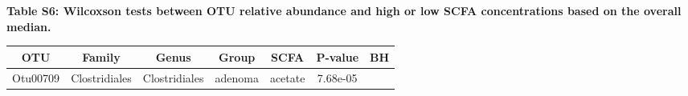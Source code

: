 \documentclass[11pt,]{article}
\begin{document}
\normalsize

\newpage

\textbf{Table S6: Wilcoxson tests between OTU relative abundance and
high or low SCFA concentrations based on the overall median.}

\scriptsize

\begin{longtable}[]{@{}ccccccc@{}}
\toprule
\begin{minipage}[b]{0.09\columnwidth}\centering\strut
OTU\strut
\end{minipage} & \begin{minipage}[b]{0.17\columnwidth}\centering\strut
Family\strut
\end{minipage} & \begin{minipage}[b]{0.17\columnwidth}\centering\strut
Genus\strut
\end{minipage} & \begin{minipage}[b]{0.09\columnwidth}\centering\strut
Group\strut
\end{minipage} & \begin{minipage}[b]{0.11\columnwidth}\centering\strut
SCFA\strut
\end{minipage} & \begin{minipage}[b]{0.09\columnwidth}\centering\strut
P-value\strut
\end{minipage} & \begin{minipage}[b]{0.09\columnwidth}\centering\strut
BH\strut
\end{minipage}\tabularnewline
\midrule
\endhead
\begin{minipage}[t]{0.09\columnwidth}\centering\strut
Otu00709\strut
\end{minipage} & \begin{minipage}[t]{0.17\columnwidth}\centering\strut
Clostridiales\strut
\end{minipage} & \begin{minipage}[t]{0.17\columnwidth}\centering\strut
Clostridiales\strut
\end{minipage} & \begin{minipage}[t]{0.09\columnwidth}\centering\strut
adenoma\strut
\end{minipage} & \begin{minipage}[t]{0.11\columnwidth}\centering\strut
acetate\strut
\end{minipage} & \begin{minipage}[t]{0.09\columnwidth}\centering\strut
7.68e-05\strut
\end{minipage} & \begin{minipage}[t]{0.09\columnwidth}\centering\strut

\end{minipage}
\end{longtable}
\end{document}
